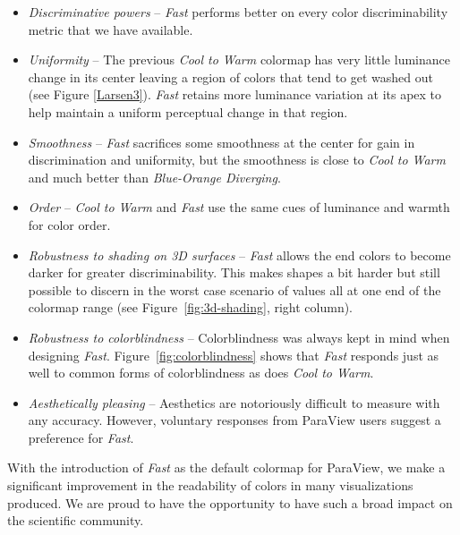\documentclass{IEEEcsmag}
\newcommand*{\colormap}[1]{\textsl{#1}\xspace}
\newcommand*{\coolwarm}{\colormap{Cool to Warm}}
\newcommand*{\blueorange}{\colormap{Blue-Orange Diverging}}
\newcommand*{\fast}{\colormap{Fast}}
\begin{document}
\begin{itemize}

\item \emph{Discriminative powers} --
  \fast performs better on every color discriminability metric that we have available.
\item \emph{Uniformity} --
  The previous \coolwarm colormap has very little luminance change in its center leaving a region of colors that tend to get washed out (see Figure \ref{Larsen3}).
  \fast retains more luminance variation at its apex to help maintain a uniform perceptual change in that region.
\item \emph{Smoothness} --
  \fast sacrifices some smoothness at the center for gain in discrimination and uniformity, but the smoothness is close to \coolwarm and much better than \blueorange.
\item \emph{Order} --
  \coolwarm and \fast use the same cues of luminance and warmth for color order.
\item \emph{Robustness to shading on 3D surfaces} --
  \fast allows the end colors to become darker for greater discriminability.
  This makes shapes a bit harder but still possible to discern in the worst case scenario of values all at one end of the colormap range (see Figure~\ref{fig:3d-shading}, right column).
\item \emph{Robustness to colorblindness} --
  Colorblindness was always kept in mind when designing \fast.
  Figure~\ref{fig:colorblindness} shows that \fast responds just as well to common forms of colorblindness as does \coolwarm.
\item \emph{Aesthetically pleasing} --
  Aesthetics are notoriously difficult to measure with any accuracy.
  However, voluntary responses from ParaView users suggest a preference for \fast.

\end{itemize}



With the introduction of \fast as the default colormap for ParaView, we make a significant improvement in the readability of colors in many visualizations produced. We are proud to have the opportunity to have such a broad impact on the scientific community.
\end{document}
